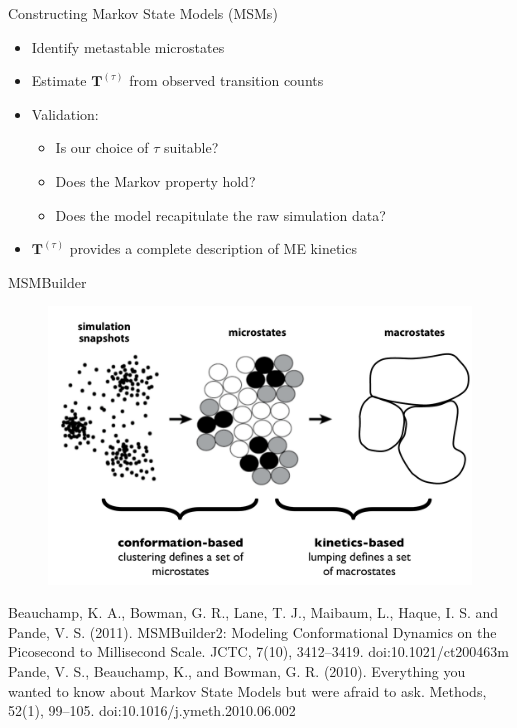 \documentclass{beamer}
\begin{document}
\begin{frame}{Constructing Markov State Models (MSMs)}

\begin{itemize}
  \item Identify metastable microstates
  \item Estimate $\mathbf{T}^{(\tau)}$ from observed transition counts
  \item Validation:
  \begin{itemize}
      \item Is our choice of $\tau$ suitable?
      \item Does the Markov property hold?
      \item Does the model recapitulate the raw simulation data?
  \end{itemize}
  \item $\mathbf{T}^{(\tau)}$ provides a complete description of ME kinetics
\end{itemize}


\end{frame}

\begin{frame}{MSMBuilder}

\begin{figure}
\includegraphics[width=1.0\textwidth]{msmbuilder}
\end{figure}

\tiny
Beauchamp, K. A., Bowman, G. R., Lane, T. J., Maibaum, L., Haque, I. S. and Pande, V. S. (2011). MSMBuilder2: Modeling Conformational Dynamics on the Picosecond to Millisecond Scale. JCTC, 7(10), 3412–3419. doi:10.1021/ct200463m
Pande, V. S., Beauchamp, K., and  Bowman, G. R. (2010). Everything you wanted to know about Markov State Models but were afraid to ask. Methods, 52(1), 99–105. doi:10.1016/j.ymeth.2010.06.002
\normalsize
\end{frame}
\end{document}
